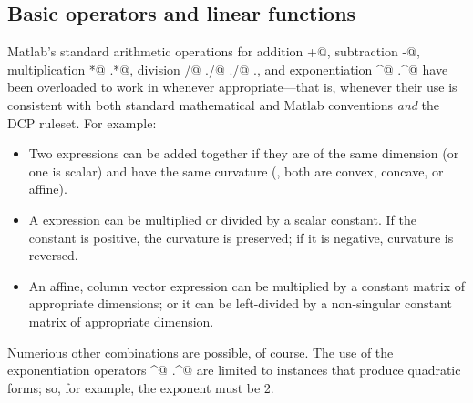 \documentclass[12pt]{article}
\begin{document}
\subsection{Basic operators and linear functions}

Matlab's standard arithmetic operations for
addition \verb@+@, subtraction \verb@-@, multiplication
\verb@*@ \verb@.*@, division \verb@/@ \verb@\@ \verb@./@
\verb@./@ \verb@.\@, and exponentiation \verb@^@ \verb@.^@
have been overloaded to work in \cvx whenever appropriate---that
is, whenever their use is consistent with both standard mathematical
and Matlab conventions \emph{and} the DCP ruleset.
For example:
\begin{itemize}
\item Two \cvx expressions can be added together if they are of the same
      dimension (or one is scalar) and have the same curvature (\ie, 
      both are convex, concave, or affine).
\item A \cvx expression can be multiplied or divided by a scalar constant. If the
      constant is positive, the curvature is preserved; if it is negative,
      curvature is reversed.      
\item An affine, column vector \cvx expression can be multiplied by a constant matrix
      of appropriate dimensions; or it can be left-divided by a non-singular 
      constant matrix of appropriate dimension.
\end{itemize}
Numerious other combinations are possible, of course.
The use of the exponentiation operators \verb@^@ \verb@.^@ are limited
to instances that produce quadratic forms; so, for example, the exponent
must be 2.
\end{document}

